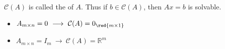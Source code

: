 \begin{definition}
    $\mathcal{C}(A)$ is called the  of $A$. Thus if $b \in \mathcal{C}(A)$, then $Ax=b$ is solvable.
    \begin{itemize}
        \item $A_{m \times n} = 0 \ \longrightarrow \ \mathcal{C}(A) = 0_{\red{m \times 1}}$
        \item $A_{m \times n} = I_m \ \longrightarrow \ \mathcal{C}(A) = \mathbb{R}^m$
    \end{itemize}
\end{definition}

